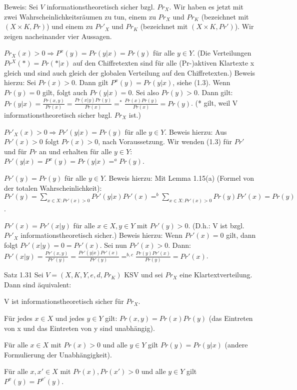 \documentclass[a4paper]{article}
\begin{document}
\begin{multicols}{3}
    Beweis: Sei $V$ informationstheoretisch sicher bzgl. $Pr_X$. Wir haben es jetzt mit zwei Wahrscheinlichkeitsräumen zu tun, einem zu $Pr_X$ und $Pr_K$ (bezeichnet mit $(X\times K,Pr)$) und einem zu $Pr'_X$ und $Pr_K$ (bezeichnet mit $(X\times K,Pr')$).
    Wir zeigen nacheinander vier Aussagen.
    \begin{enumerate*}
        \item $Pr_X(x)> 0 \Rightarrow P^x(y) = Pr(y|x) = Pr(y)$ für alle $y\in Y$. (Die Verteilungen $Pr^X(*)=Pr(*|x)$ auf den Chiffretexten sind für alle (Pr-)aktiven Klartexte x gleich und sind auch gleich der globalen Verteilung auf den Chiffretexten.) Beweis hierzu: Sei $Pr(x)>0$. Dann gilt $P^x(y)=Pr(y|x)$, siehe (1.3). Wenn $Pr(y)=0$ gilt, folgt auch $Pr(y|x)=0$. Sei also $Pr(y)>0$. Dann gilt: $Pr(y|x) =\frac{Pr(x,y)}{Pr(x)}=\frac{Pr(x|y)Pr(y)}{Pr(x)}=^* \frac{Pr(x)Pr(y)}{Pr(x)}= Pr(y)$. (* gilt, weil V informationstheoretisch sicher bzgl. $Pr_X$ ist.)
        \item  $Pr'_X(x)> 0 \Rightarrow Pr'(y|x) = Pr(y)$ für alle $y\in Y$. Beweis hierzu: Aus $Pr'(x)>0$ folgt $Pr(x)>0$, nach Voraussetzung. Wir wenden (1.3) für $Pr'$ und für $Pr$ an und erhalten für alle $y\in Y$: $Pr'(y|x)=P^x(y)=Pr(y|x)=^a Pr(y)$.
        \item  $Pr'(y)=Pr(y)$ für alle $y\in Y$. Beweis hierzu: Mit Lemma 1.15(a) (Formel von der totalen Wahrscheinlichkeit): $Pr'(y)=\sum_{x\in X: Pr'(x)> 0} Pr'(y|x)Pr'(x)=^b \sum_{x\in X: Pr'(x)> 0} Pr(y)Pr'(x) = Pr(y)$.
        \item  $Pr'(x)=Pr'(x|y)$ für alle $x\in X,y\in Y$ mit $Pr'(y)>0$. (D.h.: V ist bzgl. $Pr'_X$ informationstheoretisch sicher.) Beweis hierzu: Wenn $Pr'(x)=0$ gilt, dann folgt $Pr'(x|y)=0=Pr'(x)$. Sei nun $Pr'(x)>0$. Dann: $Pr'(x|y)=\frac{Pr'(x,y)}{Pr'(y)}=\frac{Pr'(y|x)Pr'(x)}{Pr'(y)}=^{b,c} \frac{Pr(y)Pr'(x)}{Pr(y)} = Pr'(x)$.
    \end{enumerate*}

    Satz 1.31 Sei $V=(X,K,Y,e,d,Pr_K)$ KSV und sei $Pr_X$ eine Klartextverteilung. Dann sind äquivalent:
    \begin{enumerate*}
        \item V ist informationstheoretisch sicher für $Pr_X$.
        \item Für jedes $x\in X$ und jedes $y\in Y$ gilt: $Pr(x,y)=Pr(x)Pr(y)$ (das Eintreten von x und das Eintreten von y sind unabhängig).
        \item  Für alle $x\in X$ mit $Pr(x)>0$ und alle $y\in Y$ gilt $Pr(y)=Pr(y|x)$ (andere Formulierung der Unabhängigkeit).
        \item  Für alle $x,x'\in X$ mit $Pr(x),Pr(x')>0$ und alle $y\in Y$ gilt $P^x(y)=P^{x'}(y)$.
    \end{enumerate*}


\end{multicols}
\end{document}
